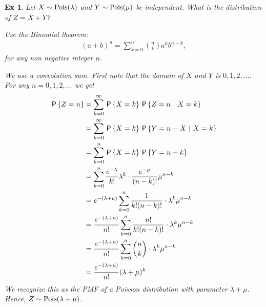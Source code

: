 \documentclass[a4paper,11pt]{article}
\newtheorem{exercise}[theorem]{Ex}
\begin{document}
\begin{exercise}
Let $X \sim \Pois{\lambda}$ and $Y \sim \Pois{\mu}$ be independent. What is the distribution of $Z = X + Y$?\\
\begin{hint}
Use the Binomial theorem:
\begin{align}
    (a + b)^n = \sum_{k=0}^n {n \choose k}a^k b^{n-k},
\end{align}
\textit{for any non negative integer $n$.}
\end{hint}

\begin{solution}
We use a convolution sum. First note that the domain of $X$ and $Y$ is $0,1,2,\ldots$. For any $n=0,1,2,\ldots$ we get
\begin{align}
    \P{Z = n} &= \sum_{k=0}^\infty \P{X = k} \P{Z = n \ | \ X = k} \\
    &= \sum_{k=0}^\infty \P{X = k} \P{Y = n - X \ | \ X = k} \\
    &= \sum_{k=0}^n \P{X = k} \P{Y = n - k} \\
    &= \sum_{k=0}^n \frac{e^{-\lambda}}{k!}\lambda^k  \cdot \frac{e^{-\mu}}{(n-k)!}\mu^{n-k}  \\
    &= e^{-(\lambda+\mu)} \sum_{k=0}^n \frac{1}{k!(n-k)!} \cdot \lambda^k\mu^{n-k}  \\
    &= \frac{e^{-(\lambda+\mu)}}{n!} \sum_{k=0}^n \frac{n!}{k!(n-k)!} \cdot \lambda^k\mu^{n-k}  \\
    &= \frac{e^{-(\lambda+\mu)}}{n!} \sum_{k=0}^n {n \choose k} \cdot \lambda^k\mu^{n-k}  \\
    &= \frac{e^{-(\lambda+\mu)}}{n!} (\lambda + \mu)^k.
\end{align}
We recognize this as the PMF of a Poisson distribution with parameter $\lambda+\mu$. Hence, $Z \sim \Pois{\lambda + \mu}$.
\end{solution}
\end{exercise}
\end{document}
